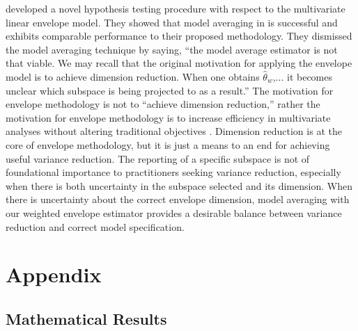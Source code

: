\documentclass{article}\usepackage[]{graphicx}\usepackage[]{color}
\begin{document}
\citet{yau2019hypothesis} developed a novel hypothesis testing procedure with respect to the multivariate linear envelope model. They showed that model averaging in \citet{eck2017weighted} is successful and exhibits comparable performance to their proposed methodology. They dismissed the model averaging technique by saying, ``the model average estimator is not that viable. We may recall that the original motivation for applying the envelope model is to achieve dimension reduction. When one obtains $\hat{\theta}_w$,$\ldots$ %
it becomes unclear which subspace is being projected to as a result.'' The motivation for envelope methodology is not to ``achieve dimension reduction,'' rather the motivation for envelope methodology is to increase efficiency in multivariate analyses without altering traditional objectives \citep[first sentence of page 1]{cook2018introduction}. Dimension reduction is at the core of envelope methodology, but it is just a means to an end for achieving useful variance reduction. The reporting of a specific subspace is not of foundational importance to practitioners seeking variance reduction, especially when there is both uncertainty in the subspace selected and its dimension. When there is uncertainty about the correct envelope dimension, model averaging with our weighted envelope estimator provides a desirable balance between variance reduction and correct model specification. 


\section*{Appendix}

\subsection*{Mathematical Results}
\end{document}
